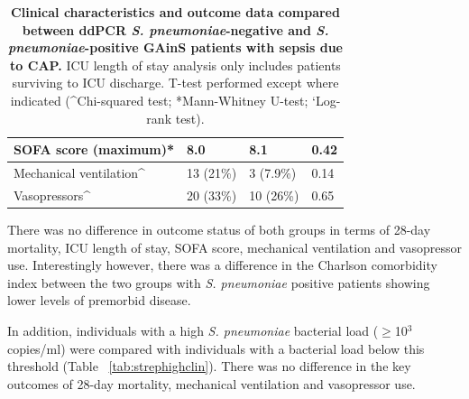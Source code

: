 \begin{table}[]
\begin{center}
\begin{tabular}{|l|l|l|l|}
SOFA score (maximum)*                                                 & 8.0                                                                      & 8.1                                                                      & 0.42             \\ \hline
Mechanical ventilation\textasciicircum{}                              & 13 (21\%)                                                                & 3 (7.9\%)                                                                & 0.14             \\ \hline
Vasopressors\textasciicircum{}                                        & 20 (33\%)                                                                & 10 (26\%)                                                                & 0.65             \\ \hline
\end{tabular}
\end{center}
\smallskip
\caption[\textit{S. pneumoniae} positivity and clinical outcomes]{\textbf{Clinical characteristics and outcome data compared between ddPCR \textit{S. pneumoniae}-negative and \textit{S. pneumoniae}-positive GAinS patients with sepsis due to CAP.} ICU length of stay analysis only includes patients surviving to ICU discharge. T-test performed except where indicated (\textasciicircum{}Chi-squared test; *Mann-Whitney U-test; `Log-rank test).} 
\label{tab:strepclin}
\end{table}
\FloatBarrier

There was no difference in outcome status of both groups in terms of 28-day mortality, ICU length of stay, SOFA score, mechanical ventilation and vasopressor use. Interestingly however, there was a difference in the Charlson comorbidity index between the two groups with \textit{S. pneumoniae} positive patients showing lower levels of premorbid disease. 

In addition, individuals with a high \textit{S. pneumoniae} bacterial load ($\geq$10$^3$ copies/ml) were compared with individuals with a bacterial load below this threshold (Table ~\ref{tab:strephighclin}). There was no difference in the key outcomes of 28-day mortality, mechanical ventilation and vasopressor use.

